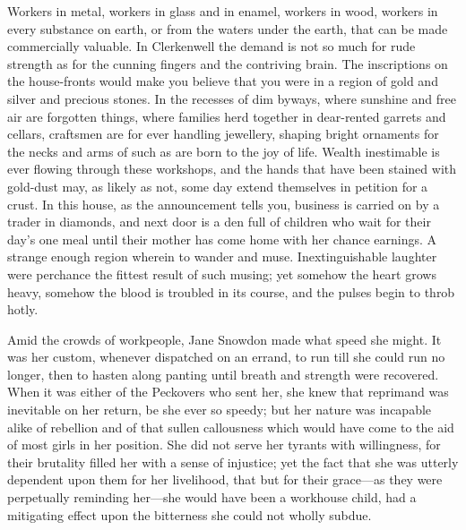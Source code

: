 {\protect\hypertarget{26}{}{}}Workers in metal, workers in glass and in
enamel, workers in wood, workers in every substance on earth, or from
the waters under the earth, that can be made commercially valuable. In
Clerkenwell the demand is not so much for rude strength as for the
cunning fingers and the contriving brain. The inscriptions on the
house-fronts would make you believe that you were in a region of gold
and silver and precious stones. In the recesses of dim byways, where
sunshine and free air are forgotten things, where families herd together
in dear-rented garrets and cellars, craftsmen are for ever handling
jewellery, shaping bright ornaments for the necks and arms of such as
are born to the joy of life. Wealth inestimable is ever flowing through
these workshops, and the hands that have been stained with gold-dust
may, as likely as not, some day extend themselves in petition for a
crust. In this house, as the announcement tells you, business is carried
on by a trader in diamonds, and next door is a den full of children who
wait for their day's one meal {\protect\hypertarget{27}{}{}}until their
mother has come home with her chance earnings. A strange enough region
wherein to wander and muse. Inextinguishable laughter were perchance the
fittest result of such musing; yet somehow the heart grows heavy,
somehow the blood is troubled in its course, and the pulses begin to
throb hotly.

Amid the crowds of workpeople, Jane Snowdon made what speed she might.
It was her custom, whenever dispatched on an errand, to run till she
could run no longer, then to hasten along panting until breath and
strength were recovered. When it was either of the Peckovers who sent
her, she knew that reprimand was inevitable on her return, be she ever
so speedy; but her nature was incapable alike of rebellion and of that
sullen callousness which would have come to the aid of most girls in her
position. She did not serve her tyrants with willingness, for their
brutality filled her with a sense of injustice; yet the fact that she
was utterly dependent upon them for her livelihood,
{\protect\hypertarget{28}{}{}}that but for their grace---as they were
perpetually reminding her---she would have been a workhouse child, had a
mitigating effect upon the bitterness she could not wholly subdue.

